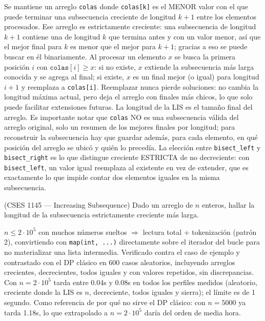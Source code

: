  Se mantiene un arreglo \texttt{colas} donde \texttt{colas[k]} es el MENOR valor con el que puede terminar una subsecuencia creciente de longitud $k+1$ entre los elementos procesados. Ese arreglo es estrictamente creciente: una subsecuencia de longitud $k+1$ contiene una de longitud $k$ que termina antes y con un valor menor, así que el mejor final para $k$ es menor que el mejor para $k+1$; gracias a eso se puede buscar en él binariamente. Al procesar un elemento $x$ se busca la primera posición $i$ con $\texttt{colas}[i] \ge x$: si no existe, $x$ extiende la subsecuencia más larga conocida y se agrega al final; si existe, $x$ es un final mejor (o igual) para longitud $i+1$ y reemplaza a \texttt{colas[i]}. Reemplazar nunca pierde soluciones: no cambia la longitud máxima actual, pero deja el arreglo con finales más chicos, lo que solo puede facilitar extensiones futuras. La longitud de la LIS es el tamaño final del arreglo. Es importante notar que \texttt{colas} NO es una subsecuencia válida del arreglo original, solo un resumen de los mejores finales por longitud; para reconstruir la subsecuencia hay que guardar además, para cada elemento, en qué posición del arreglo se ubicó y quién lo precedía. La elección entre \texttt{bisect\_left} y \texttt{bisect\_right} es lo que distingue creciente ESTRICTA de no decreciente: con \texttt{bisect\_left}, un valor igual reemplaza al existente en vez de extender, que es exactamente lo que impide contar dos elementos iguales en la misma subsecuencia.~\cite{fredman1975}


(CSES 1145 — Increasing Subsequence) Dado un arreglo de $n$ enteros, hallar la longitud de la subsecuencia estrictamente creciente más larga.

 $n \le 2\cdot10^5$ con muchos números sueltos $\Rightarrow$ lectura total + tokenización (patrón 2), convirtiendo con \texttt{map(int, ...)} directamente sobre el iterador del bucle para no materializar una lista intermedia. Verificado contra el caso de ejemplo y contrastado con el DP clásico  en 600 casos aleatorios, incluyendo arreglos crecientes, decrecientes, todos iguales y con valores repetidos, sin discrepancias. Con $n = 2\cdot10^5$ tarda entre \aprox{}0.04s y \aprox{}0.08s en todos los perfiles medidos (aleatorio, creciente donde la LIS es $n$, decreciente, todos iguales y sierra); el límite es de 1 segundo. Como referencia de por qué no sirve el DP clásico: con $n = 5000$ ya tarda \aprox{}1.18s, lo que extrapolado a $n = 2\cdot10^5$ daría del orden de media hora.

